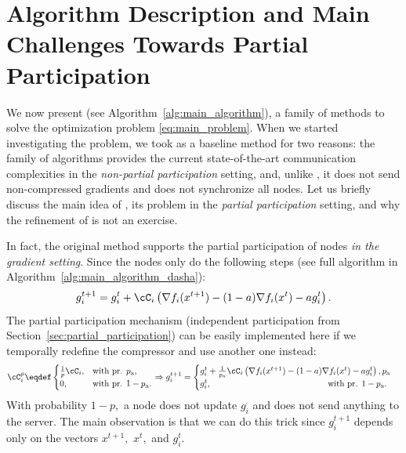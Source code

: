 \documentclass{article}
\newcommand{\algorithmname}{DASHA-PP}
\newcommand*{\probavailable}{\ensuremath{p_{\textnormal{a}}}}
\begin{document}
\section{Algorithm Description and Main Challenges Towards Partial Participation}

We now present \algname{\algorithmname} (see Algorithm~\ref{alg:main_algorithm}), a family of methods to solve the optimization problem \eqref{eq:main_problem}. When we started investigating the problem, we took  as a baseline method for two reasons: the family of algorithms  provides the current state-of-the-art communication complexities in the \emph{non-partial participation} setting, and, unlike , it does not send non-compressed gradients and does not synchronize all nodes. Let us briefly discuss the main idea of , its problem in the \emph{partial participation} setting, and why the refinement of  is not an exercise.

In fact, the original  method supports the partial participation of nodes \emph{in the gradient setting}. Since the nodes only do the following steps (see full algorithm in Algorithm~\ref{alg:main_algorithm_dasha}):
\begin{align*}
  g^{t+1}_i = g^{t}_i + \cC_i\left(\nabla f_i(x^{t+1}) - (1 - a)\nabla f_i(x^{t}) - a g^{t}_i\right).
\end{align*}
The partial participation mechanism (independent participation from Section~\ref{sec:partial_participation}) can be easily implemented here if we temporally redefine the compressor and use another one instead:
\begin{align*}
  \cC_{i}^p \eqdef \begin{cases}
    \frac{1}{p}\cC_{i},& \textnormal{with pr. } \probavailable,\\
    0,& \textnormal{with pr. } 1 - \probavailable.
  \end{cases} \Rightarrow g^{t+1}_i = \begin{cases}
    g^{t}_i + \frac{1}{\probavailable}\cC_i\left(\nabla f_i(x^{t+1}) - (1 - a)\nabla f_i(x^{t}) - a g^{t}_i\right), \probavailable\\
    g^{t}_i, \hspace{4.8cm}\textnormal{with pr. } 1 - \probavailable.
  \end{cases}
\end{align*}
With probability $1 - p,$ a node does not update $g_i^{\cdot}$ and does not send anything to the server. The main observation is that we can do this trick since $g^{t+1}_i$ depends only on the vectors $x^{t+1},$ $x^{t},$ and $g^{t}_i$.
\end{document}
